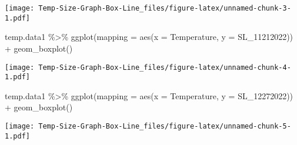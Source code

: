 \documentclass[
]{article}
\newenvironment{Shaded}{\begin{snugshade}}{\end{snugshade}}
\newcommand{\AttributeTok}[1]{\textcolor[rgb]{0.77,0.63,0.00}{#1}}
\newcommand{\FunctionTok}[1]{\textcolor[rgb]{0.00,0.00,0.00}{#1}}
\newcommand{\NormalTok}[1]{#1}
\newcommand{\SpecialCharTok}[1]{\textcolor[rgb]{0.00,0.00,0.00}{#1}}
\begin{document}
\texttt{[image: Temp-Size-Graph-Box-Line\_files/figure-latex/unnamed-chunk-3-1.pdf]}

\begin{Shaded}
\begin{Highlighting}[]
\NormalTok{temp.data1 }\SpecialCharTok{\%\textgreater{}\%}
\FunctionTok{ggplot}\NormalTok{(}\AttributeTok{mapping =} \FunctionTok{aes}\NormalTok{(}\AttributeTok{x =}\NormalTok{ Temperature, }\AttributeTok{y =}\NormalTok{ SL\_11212022)) }\SpecialCharTok{+} 
  \FunctionTok{geom\_boxplot}\NormalTok{()}
\end{Highlighting}
\end{Shaded}

\texttt{[image: Temp-Size-Graph-Box-Line\_files/figure-latex/unnamed-chunk-4-1.pdf]}

\begin{Shaded}
\begin{Highlighting}[]
\NormalTok{temp.data1 }\SpecialCharTok{\%\textgreater{}\%}
\FunctionTok{ggplot}\NormalTok{(}\AttributeTok{mapping =} \FunctionTok{aes}\NormalTok{(}\AttributeTok{x =}\NormalTok{ Temperature, }\AttributeTok{y =}\NormalTok{ SL\_12272022)) }\SpecialCharTok{+} 
  \FunctionTok{geom\_boxplot}\NormalTok{()}
\end{Highlighting}
\end{Shaded}

\texttt{[image: Temp-Size-Graph-Box-Line\_files/figure-latex/unnamed-chunk-5-1.pdf]}
\end{document}
